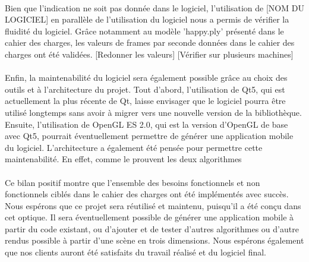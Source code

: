 \paragraph{}
Bien que l'indication ne soit pas donnée dans le logiciel, l'utilisation de [NOM DU LOGICIEL] en parallèle de l'utilisation du logiciel nous a permis de vérifier la fluidité du logiciel. Grâce notamment au modèle 'happy.ply' présenté dans le cahier des charges, les valeurs de frames par seconde données dans le cahier des charges ont été validées.
[Redonner les valeurs]
[Vérifier sur plusieurs machines]

\paragraph{}
Enfin, la maintenabilité du logiciel sera également possible grâce au choix des outils et à l'architecture du projet. 
Tout d'abord, l'utilisation de Qt5, qui est actuellement la plus récente de Qt, laisse envisager que le logiciel pourra être utilisé longtemps sans avoir à migrer vers une nouvelle version de la bibliothèque. Ensuite, l'utilisation de OpenGL ES 2.0, qui est la version d'OpenGL de base avec Qt5, pourrait éventuellement permettre de générer une application mobile du logiciel. 
L'architecture a également été pensée pour permettre cette maintenabilité. En effet, comme le prouvent les deux algorithmes 


\paragraph{}
Ce bilan positif montre que l'ensemble des besoins fonctionnels et non fonctionnels ciblés dans le cahier des charges ont été implémentés avec succès. Nous espérons que ce projet sera réutilisé et maintenu, puisqu'il a été conçu dans cet optique. Il sera éventuellement possible de générer une application mobile à partir du code existant, ou d'ajouter et de tester d'autres algorithmes ou d'autre rendus possible à partir d'une scène en trois dimensions. Nous espérons également que nos clients auront été satisfaits du travail réalisé et du logiciel final. 
